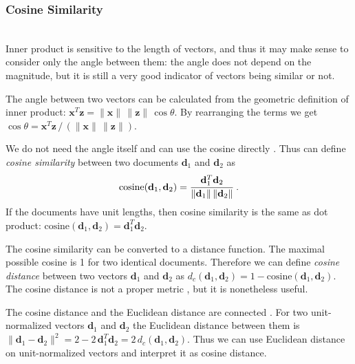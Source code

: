 \subsubsection{Cosine Similarity} \label{sec:cosine} \ \\




Inner product is sensitive to the length of vectors, and thus
it may make sense to consider only the angle between them:
the angle does not depend on the magnitude, but it is still
a very good indicator of vectors being similar or not.

The angle between two vectors can be calculated from the geometric
definition of inner product:
$\mathbf x^T \mathbf z = \|\mathbf x \| \, \| \mathbf z \| \, \cos \theta$.
By rearranging the terms we get
$\cos \theta = \mathbf x^T \mathbf z \, / \, (\|\mathbf x \| \, \| \mathbf z \|)$.

We do not need the angle itself and can use the cosine directly
\cite{manning2008introduction}.
Thus can define \emph{cosine similarity} between two documents $\mathbf d_1$ and
$\mathbf d_2$ as
$$\text{cosine}(\mathbf d_1, \mathbf d_2) = \cfrac{\mathbf d_1^T \mathbf d_2}{\|\mathbf d_1 \| \, \| \mathbf d_2 \|} \ .$$
If the documents have unit lengths, then cosine similarity is the same as
dot product: $\text{cosine}(\mathbf d_1, \mathbf d_2) = \mathbf d_1^T \mathbf d_2$.

The cosine similarity can be converted to a distance function.
The maximal possible cosine is 1 for two identical documents.
Therefore we can define \emph{cosine distance} between two vectors
$\mathbf d_1$ and $\mathbf d_2$ as
$d_c(\mathbf d_1, \mathbf d_2) = 1 - \text{cosine}(\mathbf d_1, \mathbf d_2)$.
The cosine distance is not a proper metric \cite{korenius2007principal},
but it is nonetheless useful.

The cosine distance and the Euclidean distance are connected \cite{korenius2007principal}.
For two unit-normalized vectors $\mathbf d_1$ and $\mathbf d_2$ the Euclidean distance
between them is $\| \mathbf d_1 - \mathbf d_2 \|^2 = 2 - 2 \, \mathbf d_1^T \mathbf d_2 =2 \, d_c(\mathbf d_1, \mathbf d_2)$. Thus we can use Euclidean distance on
unit-normalized vectors and interpret it as cosine distance.


